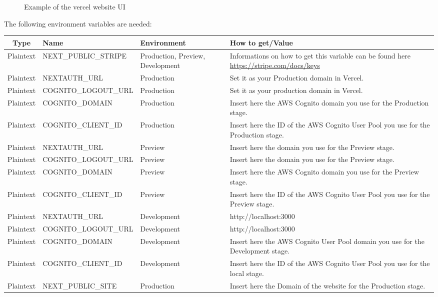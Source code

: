 \begin{enumerate}
\begin{figure}[H]
\caption{Example of the vercel website UI}
\end{figure}
The following environment variables are needed:\\
\setcounter{table}{-1}
{
\centering
\renewcommand{\arraystretch}{1.5}
\begin{longtable}{c C{6cm} C{3cm} C{5cm}}
\textbf{Type} &
\textbf{Name} &
\textbf{Environment} &
\textbf{How to get/Value}\\
\endhead

Plaintext & NEXT\_PUBLIC\_STRIPE & Production, Preview, Development & Informations on how to get this variable can be found here \url{https://stripe.com/docs/keys}\\
Plaintext & NEXTAUTH\_URL & Production & Set it as your Production domain in Vercel.\\
Plaintext & COGNITO\_LOGOUT\_URL & Production & Set it as your production domain in Vercel.\\
Plaintext & COGNITO\_DOMAIN & Production & Insert here the AWS Cognito domain you use for the Production stage.\\
Plaintext & COGNITO\_CLIENT\_ID & Production & Insert here the ID of the AWS Cognito User Pool you use for the Production stage.\\
Plaintext & NEXTAUTH\_URL & Preview & Insert here the domain you use for the Preview stage.\\
Plaintext & COGNITO\_LOGOUT\_URL & Preview & Insert here the domain you use for the Preview stage.\\
Plaintext & COGNITO\_DOMAIN & Preview & Insert here the AWS Cognito domain you use for the Preview stage.\\
Plaintext & COGNITO\_CLIENT\_ID & Preview & Insert here the ID of the AWS Cognito User Pool you use for the Preview stage.\\
Plaintext & NEXTAUTH\_URL & Development & http://localhost:3000 \\
Plaintext & COGNITO\_LOGOUT\_URL & Development & http://localhost:3000 \\
Plaintext & COGNITO\_DOMAIN & Development & Insert here the AWS Cognito User Pool domain you use for the Development stage.\\
Plaintext & COGNITO\_CLIENT\_ID & Development & Insert here the ID of the AWS Cognito User Pool you use for the local stage.\\
Plaintext & NEXT\_PUBLIC\_SITE & Production & Insert here the Domain of the website for the Production stage.\\

\end{longtable}}
\end{enumerate}
